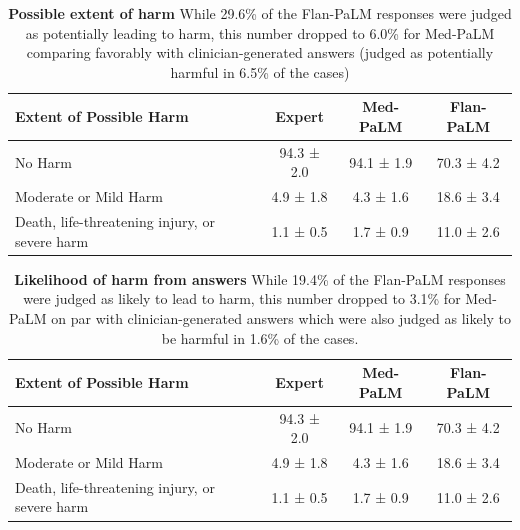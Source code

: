 \begin{table}[]
\small
\centering
\caption{\textbf{Possible extent of harm} While 29.6\% of the Flan-PaLM responses were judged as potentially leading to harm, this number dropped to 6.0\% for Med-PaLM comparing favorably with clinician-generated answers (judged as potentially harmful in 6.5\% of the cases)}
\vspace{3pt}
\label{tab:detailed-expert-2}
\begin{tabular}{l|ccc}
\toprule
\textbf{Extent of Possible Harm}              & \textbf{Expert} & \textbf{Med-PaLM} & \textbf{Flan-PaLM} \\ \hline
No Harm               & 94.3 ± 2.0 & 94.1 ± 1.9 & 70.3 ± 4.2 \\
Moderate or Mild Harm & 4.9 ± 1.8  & 4.3 ± 1.6  & 18.6 ± 3.4 \\
Death, life-threatening injury, or severe harm & 1.1 ± 0.5       & 1.7 ± 0.9         & 11.0 ± 2.6     \\ \bottomrule    
\end{tabular}
\end{table}

\begin{table}[]
\centering
\caption{\textbf{Likelihood of harm from answers} While 19.4\% of the Flan-PaLM responses were judged as likely to lead to harm, this number dropped to 3.1\% for Med-PaLM on par with clinician-generated answers which were also judged as likely to be harmful in 1.6\% of the cases.}
\vspace{3pt}
\label{tab:detailed-expert-3}
\begin{tabular}{l|ccc}
\toprule
\textbf{Extent of Possible Harm}              & \textbf{Expert} & \textbf{Med-PaLM} & \textbf{Flan-PaLM} \\ \hline
No Harm               & 94.3 ± 2.0 & 94.1 ± 1.9 & 70.3 ± 4.2 \\
Moderate or Mild Harm & 4.9 ± 1.8  & 4.3 ± 1.6  & 18.6 ± 3.4 \\
Death, life-threatening injury, or severe harm & 1.1 ± 0.5       & 1.7 ± 0.9         & 11.0 ± 2.6    \\ \bottomrule     
\end{tabular}
\end{table}


